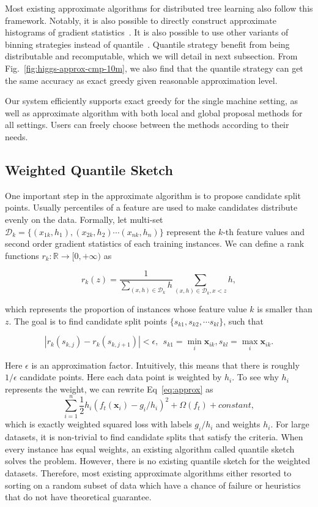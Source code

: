 Most existing approximate algorithms for distributed tree learning also follow this framework. Notably, it is also possible to directly construct approximate histograms of gradient statistics~\cite{tyree2011parallel}. It is also possible to use other variants of binning strategies instead of quantile~\cite{McRank}. Quantile strategy benefit from being distributable and recomputable, which we will detail in next subsection. From Fig.~\ref{fig:higgs-approx-cmp-10m}, we also find that the quantile strategy can get the same accuracy as exact greedy given reasonable approximation level.

Our system efficiently supports exact greedy for the single machine setting, as well as approximate algorithm with both local and global proposal methods for all settings. Users can freely choose between the methods according to their needs.

\subsection{Weighted Quantile Sketch}\label{sec:quantile}
One important step in the approximate algorithm is to propose candidate split points. Usually percentiles of a feature are used to make candidates distribute evenly on the data. Formally, let multi-set
$\mathcal{D}_k=\{(x_{1k}, h_1), (x_{2k}, h_2) \cdots (x_{nk}, h_n)\}$
represent the $k$-th feature values and second order gradient statistics of each training instances. We can define a rank functions $r_{k} : \mathbb{R} \rightarrow [0, +\infty)$ as

\begin{equation}
    r_{k}(z) =\frac{1}{\sum_{(x, h)\in \mathcal{D}_k} h} \sum_{(x, h)\in \mathcal{D}_k, x < z} h,
\end{equation}

which represents the proportion of instances whose feature value $k$ is smaller than $z$. The goal is to find candidate split points $\{s_{k1}, s_{k2}, \cdots s_{kl}\}$, such that

\begin{equation}
    |r_{k}(s_{k,j})  - r_{k}(s_{k,j+1})| < \epsilon, \ \ s_{k1} = \min_i \mathbf{x}_{ik},  s_{kl} = \max_i \mathbf{x}_{ik}.
\end{equation}

 \label{eq:quantile}
Here $\epsilon$ is an approximation factor. Intuitively, this means that there is roughly $1 / \epsilon$ candidate points. Here each data point is weighted by $h_i$. To see why $h_i$ represents the weight, we can rewrite  Eq~\eqref{eq:approx} as $$
\sum_{i=1}^n \frac{1}{2} h_i (f_t(\mathbf{x}_i) - g_i / h_i )^2 + \Omega(f_t) + constant, $$ which is exactly weighted squared loss with labels $g_i/h_i$ and weights $h_i$. For large datasets, it is non-trivial to find candidate splits that satisfy the criteria. When every instance has equal  weights, an existing algorithm called quantile sketch~\cite{Greenwald:SIGMOID01,Zhang:SSDBM} solves the problem. However, there is no existing quantile sketch for the weighted datasets. Therefore, most existing approximate algorithms either resorted to sorting on a random subset of data which have a chance of failure or heuristics that do not have theoretical guarantee.

